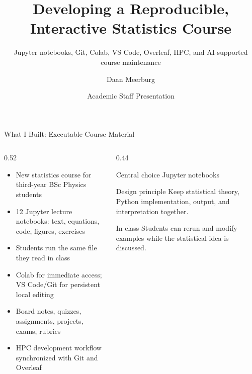 \documentclass[aspectratio=169,11pt]{beamer}
\title[Interactive Statistics Course]{Developing a Reproducible, Interactive Statistics Course}
\subtitle{Jupyter notebooks, Git, Colab, VS Code, Overleaf, HPC, and AI-supported course maintenance}
\author{Daan Meerburg}
\institute{University of Groningen}
\date{Academic Staff Presentation}
\begin{document}
\begin{frame}
  \titlepage
\end{frame}

\begin{frame}{What I Built: Executable Course Material}
  \begin{columns}[T,totalwidth=\textwidth]
    \begin{column}{0.52\textwidth}
      \begin{itemize}
        \item New statistics course for third-year BSc Physics students
        \item 12 Jupyter lecture notebooks: text, equations, code, figures, exercises
        \item Students run the same file they read in class
        \item Colab for immediate access; VS Code/Git for persistent local editing
        \item Board notes, quizzes, assignments, projects, exams, rubrics
        \item HPC development workflow synchronized with Git and Overleaf
      \end{itemize}
    \end{column}
    \begin{column}{0.44\textwidth}
      \begin{block}{Central choice}
        \Large Jupyter notebooks
      \end{block}
      \begin{block}{Design principle}
        Keep statistical theory, Python implementation, output, and interpretation together.
      \end{block}
      \begin{block}{In class}
        Students can rerun and modify examples while the statistical idea is discussed.
      \end{block}
    \end{column}
  \end{columns}
\end{frame}
\end{document}
